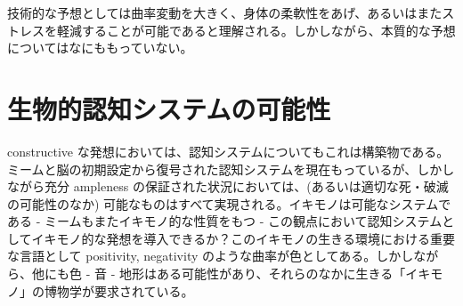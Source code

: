 \documentclass{jsarticle}
\theoremstyle{break}
\begin{document}
技術的な予想としては曲率変動を大きく、身体の柔軟性をあげ、あるいはまたストレスを軽減することが可能であると理解される。しかしながら、本質的な予想についてはなにももっていない。

\section{生物的認知システムの可能性}
constructive な発想においては、認知システムについてもこれは構築物である。ミームと脳の初期設定から復号された認知システムを現在もっているが、しかしながら充分 ampleness の保証された状況においては、(あるいは適切な死・破滅の可能性のなか) 可能なものはすべて実現される。イキモノは可能なシステムである - ミームもまたイキモノ的な性質をもつ - この観点において認知システムとしてイキモノ的な発想を導入できるか？このイキモノの生きる環境における重要な言語として positivity, negativity のような曲率が色としてある。しかしながら、他にも色 - 音 - 地形はある可能性があり、それらのなかに生きる「イキモノ」の博物学が要求されている。
\end{document}
